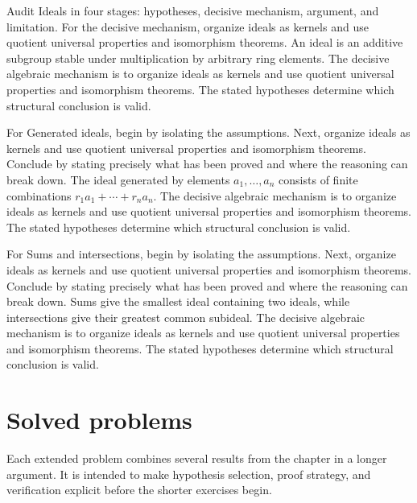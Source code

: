 \begin{example}\label{ex:v01-worked-02}
Audit Ideals in four stages: hypotheses, decisive mechanism, argument, and limitation. For the decisive mechanism, organize ideals as kernels and use quotient universal properties and isomorphism theorems. An ideal is an additive subgroup stable under multiplication by arbitrary ring elements. The decisive algebraic mechanism is to organize ideals as kernels and use quotient universal properties and isomorphism theorems. The stated hypotheses determine which structural conclusion is valid.
\end{example}

\begin{example}\label{ex:v01-worked-03}
For Generated ideals, begin by isolating the assumptions. Next, organize ideals as kernels and use quotient universal properties and isomorphism theorems. Conclude by stating precisely what has been proved and where the reasoning can break down. The ideal generated by elements $a_1,\dots,a_n$ consists of finite combinations $r_1a_1+\cdots+r_na_n$. The decisive algebraic mechanism is to organize ideals as kernels and use quotient universal properties and isomorphism theorems. The stated hypotheses determine which structural conclusion is valid.
\end{example}

\begin{example}\label{ex:v01-worked-04}
For Sums and intersections, begin by isolating the assumptions. Next, organize ideals as kernels and use quotient universal properties and isomorphism theorems. Conclude by stating precisely what has been proved and where the reasoning can break down. Sums give the smallest ideal containing two ideals, while intersections give their greatest common subideal. The decisive algebraic mechanism is to organize ideals as kernels and use quotient universal properties and isomorphism theorems. The stated hypotheses determine which structural conclusion is valid.
\end{example}

\section{Solved problems}
Each extended problem combines several results from the chapter in a longer argument. It is intended to make hypothesis selection, proof strategy, and verification explicit before the shorter exercises begin.

